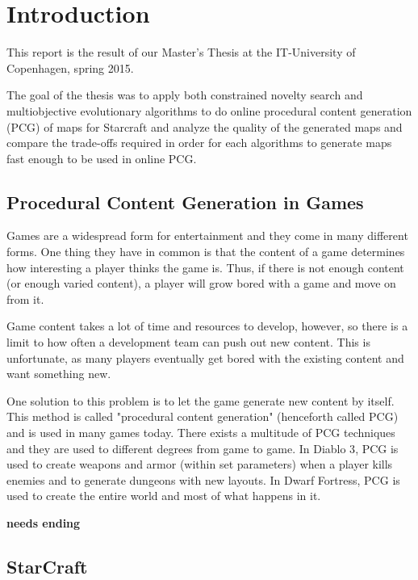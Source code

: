 \chapter{Introduction}
\label{introduction}

This report is the result of our Master's Thesis at the IT-University of Copenhagen, spring 2015.

The goal of the thesis was to apply both constrained novelty search and multiobjective evolutionary algorithms to do online procedural content generation (PCG) of maps for Starcraft and analyze the quality of the generated maps and compare the trade-offs required in order for each algorithms to generate maps fast enough to be used in online\cite{shaker2015procedural} PCG.

\section{Procedural Content Generation in Games}
\label{introdution_pcg}

Games are a widespread form for entertainment and they come in many different forms. One thing they have in common is that the content of a game determines how interesting a player thinks the game is. Thus, if there is not enough content (or enough varied content), a player will grow bored with a game and move on from it.

Game content takes a lot of time and resources to develop, however, so there is a limit to how often a development team can push out new content. This is unfortunate, as many players eventually get bored with the existing content and want something new.

One solution to this problem is to let the game generate new content by itself. This method is called "procedural content generation" (henceforth called PCG) and is used in many games today. There exists a multitude of PCG techniques and they are used to different degrees from game to game. In Diablo 3\cite{diablo3}, PCG is used to create weapons and armor (within set parameters) when a player kills enemies and to generate dungeons with new layouts. In Dwarf Fortress\cite{dwarffortress}, PCG is used to create the entire world and most of what happens in it.

\textbf{needs ending}

\section{StarCraft}
\label{introduction_starcraft}

